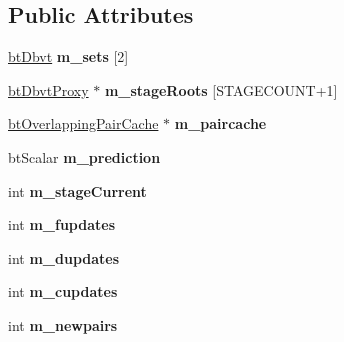 \subsection*{Public Attributes}
\begin{DoxyCompactItemize}
\item 
\mbox{\label{structbtDbvtBroadphase_a1eb595d8cd2c14c2f5747a32a5c17d86}} 
\hyperlink{structbtDbvt}{bt\+Dbvt} {\bfseries m\+\_\+sets} \mbox{[}2\mbox{]}
\item 
\mbox{\label{structbtDbvtBroadphase_a6d387961d3bd2c31e93fa4f0149e676a}} 
\hyperlink{structbtDbvtProxy}{bt\+Dbvt\+Proxy} $\ast$ {\bfseries m\+\_\+stage\+Roots} \mbox{[}S\+T\+A\+G\+E\+C\+O\+U\+NT+1\mbox{]}
\item 
\mbox{\label{structbtDbvtBroadphase_a1dc05da6b96c0aaa6520ff8266f19ab2}} 
\hyperlink{classbtOverlappingPairCache}{bt\+Overlapping\+Pair\+Cache} $\ast$ {\bfseries m\+\_\+paircache}
\item 
\mbox{\label{structbtDbvtBroadphase_a845f50b4f39731f504e30232fc6bd3df}} 
bt\+Scalar {\bfseries m\+\_\+prediction}
\item 
\mbox{\label{structbtDbvtBroadphase_a73eca8e613cdb58fa5a0683d532391d2}} 
int {\bfseries m\+\_\+stage\+Current}
\item 
\mbox{\label{structbtDbvtBroadphase_a6bce6ec08430397703831d2e984f2ef2}} 
int {\bfseries m\+\_\+fupdates}
\item 
\mbox{\label{structbtDbvtBroadphase_a4567abb3b5025ddb79660945ccafba8f}} 
int {\bfseries m\+\_\+dupdates}
\item 
\mbox{\label{structbtDbvtBroadphase_aea172d009af50647fd4024bfd798ed31}} 
int {\bfseries m\+\_\+cupdates}
\item 
\mbox{\label{structbtDbvtBroadphase_ad7842ea05865770fa4bde1adc7c6380f}} 
int {\bfseries m\+\_\+newpairs}
\item 
\mbox{\label{structbtDbvtBroadphase_ad6ff1b7159773d1c03d1fde474d60c6c}} 

\end{DoxyCompactItemize}

